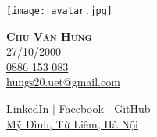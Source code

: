 \documentclass[letterpaper,11pt]{article}
\begin{document}

\begin{center}
    \noindent\begin{minipage}{0.2\textwidth}%
\texttt{[image: avatar.jpg]}
\end{minipage}%
\hfill%
\begin{minipage}{0.7\textwidth}\raggedright
\textbf{\Huge \scshape Chu Văn Hưng} \\ \vspace{10pt}
\small
    \faBirthdayCake \hspace{.5pt} 27/10/2000 \\ \vspace{3pt}
    \faMobile \hspace{.5pt} \href{tel:0886153083}{0886 153 083} \\ \vspace{3pt}
    \faAt \hspace{.5pt} \href{mailto:hungs20.uet@gmail.com}{hungs20.uet@gmail.com} \\ \vspace{3pt}
    
    \faLinkedinSquare \hspace{.5pt} \href{https://www.linkedin.com/in/hungs20}{LinkedIn}
    $|$
    \faFacebook \hspace{.5pt} \href{https://fb.com/it.hungcv}{Facebook}
    $|$
    \faGithub \hspace{.5pt} \href{https://github.com/hungs20}{GitHub}\\ \vspace{3pt}
    \faMapMarker \hspace{.5pt} \href{https://goo.gl/maps/9sLbJwDmryodERvY6}{Mỹ Đình, Từ Liêm, Hà Nội}
\end{minipage}

\end{center}
\end{document}
